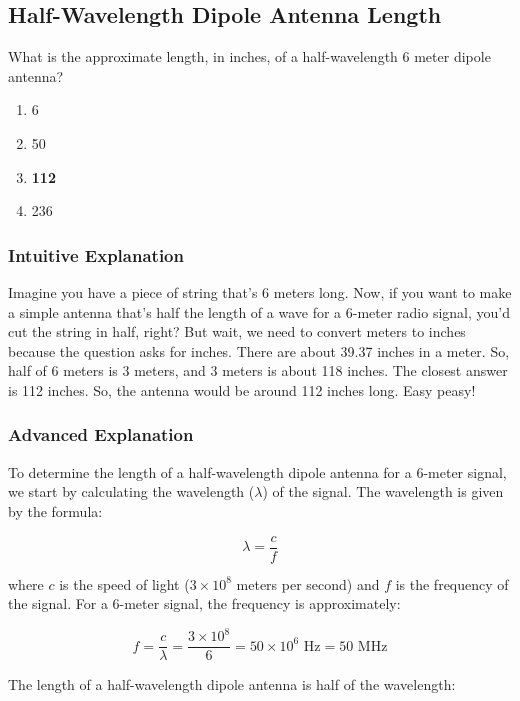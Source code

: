 \subsection{Half-Wavelength Dipole Antenna Length}
\label{T9A09}

\begin{tcolorbox}[colback=gray!10!white,colframe=black!75!black,title=T9A09]
What is the approximate length, in inches, of a half-wavelength 6 meter dipole antenna?
\begin{enumerate}[label=\Alph*)]
    \item 6
    \item 50
    \item \textbf{112}
    \item 236
\end{enumerate}
\end{tcolorbox}

\subsubsection*{Intuitive Explanation}
Imagine you have a piece of string that’s 6 meters long. Now, if you want to make a simple antenna that’s half the length of a wave for a 6-meter radio signal, you’d cut the string in half, right? But wait, we need to convert meters to inches because the question asks for inches. There are about 39.37 inches in a meter. So, half of 6 meters is 3 meters, and 3 meters is about 118 inches. The closest answer is 112 inches. So, the antenna would be around 112 inches long. Easy peasy!

\subsubsection*{Advanced Explanation}
To determine the length of a half-wavelength dipole antenna for a 6-meter signal, we start by calculating the wavelength (\(\lambda\)) of the signal. The wavelength is given by the formula:

\[
\lambda = \frac{c}{f}
\]

where \(c\) is the speed of light (\(3 \times 10^8\) meters per second) and \(f\) is the frequency of the signal. For a 6-meter signal, the frequency is approximately:

\[
f = \frac{c}{\lambda} = \frac{3 \times 10^8}{6} = 50 \times 10^6 \text{ Hz} = 50 \text{ MHz}
\]

The length of a half-wavelength dipole antenna is half of the wavelength:


